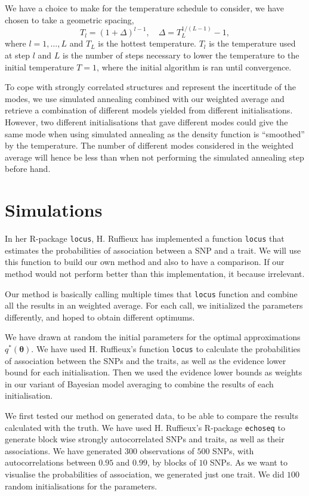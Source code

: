 \documentclass[a4paper, 11pt]{report}
\numberwithin{equation}{chapter}
\begin{document}
We have a choice to make for the temperature schedule to consider, we have chosen to take a geometric spacing,
\begin{equation*}
T_l = (1 + \Delta)^{l-1},\quad \Delta = T_L^{1/(L-1)}-1,
\end{equation*}
where $l = 1,\dots,L$ and $T_L$ is the hottest temperature. $T_l$ is the temperature used at step $l$ and $L$ is the number of steps necessary to lower the temperature to the initial temperature $T = 1$, where the initial algorithm is ran until convergence.

To cope with strongly correlated structures and represent the incertitude of the modes, we use simulated annealing combined with our weighted average and retrieve a combination of different models yielded from different initialisations. However, two different initialisations that gave different modes could give the same mode when using simulated annealing as the density function is ``smoothed'' by the temperature. The number of different modes considered in the weighted average will hence be less than when not performing the simulated annealing step before hand.

\newpage
\chapter{Simulations}
In her R-package \texttt{locus}, H. Ruffieux has implemented a function \texttt{locus} that estimates the probabilities of association between a SNP and a trait. We will use this function to build our own method and also to have a comparison. If our method would not perform better than this implementation, it because irrelevant.

Our method is basically calling multiple times that \texttt{locus} function and combine all the results in an weighted average. For each call, we initialized the parameters differently, and hoped to obtain different optimums.

We have drawn at random the initial parameters for the optimal approximations $q^*(\boldsymbol{\theta})$. We have used H. Ruffieux's function \texttt{locus} to calculate the probabilities of association between the SNPs and the traits, as well as the evidence lower bound for each initialisation. Then we used the evidence lower bounds as weights in our variant of Bayesian model averaging to combine the results of each initialisation.

We first tested our method on generated data, to be able to compare the results calculated with the truth. We have used H. Ruffieux's R-package \texttt{echoseq} to generate block wise strongly autocorrelated SNPs and traits, as well as their associations. We have generated $300$ observations of $500$ SNPs, with autocorrelations between $0.95$ and $0.99$, by blocks of $10$ SNPs. As we want to visualise the probabilities of association, we generated just one trait. We did $100$ random initialisations for the parameters.
\end{document}
